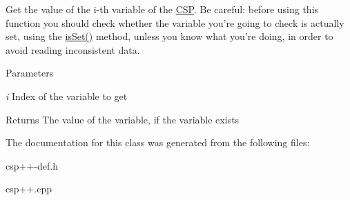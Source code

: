 Get the value of the i-\/th variable of the \hyperlink{classCSP}{CSP}. Be careful: before using this function you should check whether the variable you're going to check is actually set, using the \hyperlink{classCSP_a213dafc1aae7b1825371810a511eca4f}{isSet()} method, unless you know what you're doing, in order to avoid reading inconsistent data. 


\begin{DoxyParams}{Parameters}
\item[{\em i}]Index of the variable to get \end{DoxyParams}
\begin{DoxyReturn}{Returns}
The value of the variable, if the variable exists 
\end{DoxyReturn}


The documentation for this class was generated from the following files:\begin{DoxyCompactItemize}
\item 
csp++-\/def.h\item 
csp++.cpp\end{DoxyCompactItemize}
